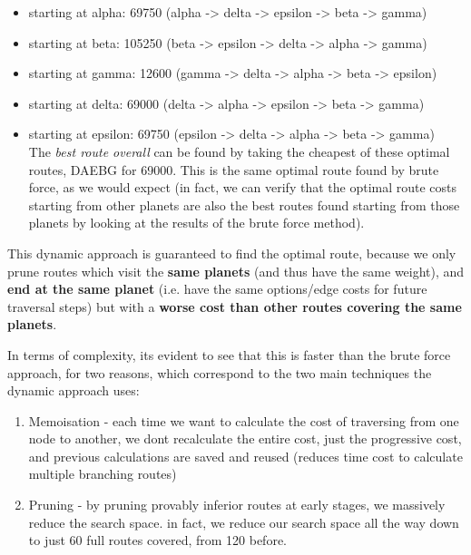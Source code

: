 \documentclass[
]{article}
\providecommand{\tightlist}{%
  \setlength{\itemsep}{0pt}\setlength{\parskip}{0pt}}
\begin{document}
\begin{itemize}
\tightlist
\item
  starting at alpha: 69750 (alpha -\textgreater{} delta -\textgreater{}
  epsilon -\textgreater{} beta -\textgreater{} gamma)
\item
  starting at beta: 105250 (beta -\textgreater{} epsilon -\textgreater{}
  delta -\textgreater{} alpha -\textgreater{} gamma)
\item
  starting at gamma: 12600 (gamma -\textgreater{} delta -\textgreater{}
  alpha -\textgreater{} beta -\textgreater{} epsilon)
\item
  starting at delta: 69000 (delta -\textgreater{} alpha -\textgreater{}
  epsilon -\textgreater{} beta -\textgreater{} gamma)
\item
  starting at epsilon: 69750 (epsilon -\textgreater{} delta
  -\textgreater{} alpha -\textgreater{} beta -\textgreater{} gamma)\\
  The \emph{best route overall} can be found by taking the cheapest of
  these optimal routes, DAEBG for 69000. This is the same optimal route
  found by brute force, as we would expect (in fact, we can verify that
  the optimal route costs starting from other planets are also the best
  routes found starting from those planets by looking at the results of
  the brute force method).
\end{itemize}

This dynamic approach is guaranteed to find the optimal route, because
we only prune routes which visit the \textbf{same planets} (and thus
have the same weight), and \textbf{end at the same planet} (i.e. have
the same options/edge costs for future traversal steps) but with a
\textbf{worse cost than other routes covering the same planets}.

In terms of complexity, it\textquotesingle s evident to see that this is
faster than the brute force approach, for two reasons, which correspond
to the two main techniques the dynamic approach uses:

\begin{enumerate}
\tightlist
\item
  Memoisation - each time we want to calculate the cost of traversing
  from one node to another, we don\textquotesingle t recalculate the
  entire cost, just the progressive cost, and previous calculations are
  saved and reused (reduces time cost to calculate multiple branching
  routes)
\item
  Pruning - by pruning provably inferior routes at early stages, we
  massively reduce the search space. in fact, we reduce our search space
  all the way down to just 60 full routes covered, from 120 before.
\end{enumerate}
\end{document}
